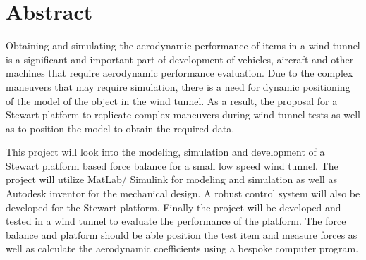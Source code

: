 
\section*{Abstract}
\label{sec:Abstract}
Obtaining and simulating the aerodynamic performance of items in a wind tunnel is a
significant and important part of development of vehicles, aircraft and other machines
that require aerodynamic performance evaluation. Due to the complex maneuvers
that may require simulation, there is a need for dynamic positioning of the model of the object in the wind tunnel. As a result, the proposal for a Stewart platform to
replicate complex maneuvers during wind tunnel tests as well as to position the model to
obtain the required data.

This project will look into the modeling, simulation and development of a Stewart
platform based force balance for a small low speed wind tunnel. The project will utilize
MatLab/ Simulink for modeling and simulation as well as Autodesk inventor for the mechanical
design. A robust control system will also be developed for the Stewart platform.
Finally the project will be developed and tested in a wind tunnel to evaluate the performance
of the platform. The force balance and platform should be able position the test
item and measure forces as well as calculate the aerodynamic coefficients using a bespoke computer program.




